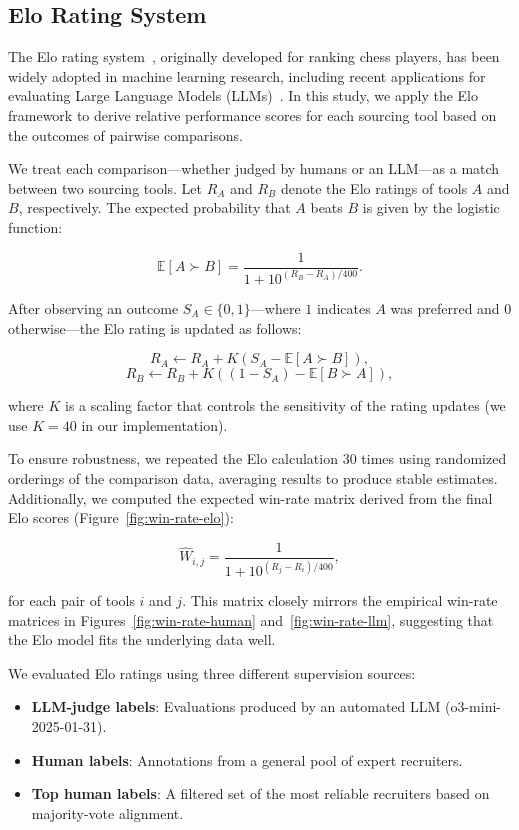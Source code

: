 \documentclass{article}
\begin{document}
\subsection{Elo Rating System}

The Elo rating system~\cite{elo1966uscf}, originally developed for ranking chess players, has been widely adopted in machine learning research, including recent applications for evaluating Large Language Models (LLMs)~\cite{zheng2023judging}. In this study, we apply the Elo framework to derive relative performance scores for each sourcing tool based on the outcomes of pairwise comparisons.

We treat each comparison—whether judged by humans or an LLM—as a match between two sourcing tools. Let $R_A$ and $R_B$ denote the Elo ratings of tools $A$ and $B$, respectively. The expected probability that $A$ beats $B$ is given by the logistic function:

\[
\mathbb{E}[A \succ B] = \frac{1}{1 + 10^{(R_B - R_A)/400}}.
\]

After observing an outcome $S_A \in \{0, 1\}$—where $1$ indicates $A$ was preferred and $0$ otherwise—the Elo rating is updated as follows:

\[
R_A \leftarrow R_A + K (S_A - \mathbb{E}[A \succ B]),
\]
\[
R_B \leftarrow R_B + K ((1 - S_A) - \mathbb{E}[B \succ A]),
\]

where $K$ is a scaling factor that controls the sensitivity of the rating updates (we use $K = 40$ in our implementation).

To ensure robustness, we repeated the Elo calculation 30 times using randomized orderings of the comparison data, averaging results to produce stable estimates. Additionally, we computed the expected win-rate matrix derived from the final Elo scores (Figure~\ref{fig:win-rate-elo}):

\[
\hat{W}_{i,j} = \frac{1}{1 + 10^{(R_j - R_i)/400}},
\]

for each pair of tools $i$ and $j$. This matrix closely mirrors the empirical win-rate matrices in Figures~\ref{fig:win-rate-human} and~\ref{fig:win-rate-llm}, suggesting that the Elo model fits the underlying data well.

We evaluated Elo ratings using three different supervision sources:

\begin{itemize}
    \item \textbf{LLM-judge labels}: Evaluations produced by an automated LLM (o3-mini-2025-01-31).
    \item \textbf{Human labels}: Annotations from a general pool of expert recruiters.
    \item \textbf{Top human labels}: A filtered set of the most reliable recruiters based on majority-vote alignment.
\end{itemize}
\end{document}
